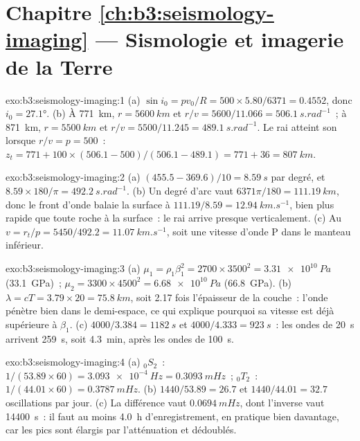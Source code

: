 \section*{Chapitre \ref{ch:b3:seismology-imaging} --- Sismologie et imagerie de la Terre}

\begin{solution}{exo:b3:seismology-imaging:1}
(a) $\sin i_0 = pv_0/R = 500\times5.80/6371 = 0.4552$, donc $i_0 = \ang{27.1}$.
(b) À \qty{771}{km}, $r = \qty{5600}{km}$ et $r/v = 5600/11.066 =
\qty{506.1}{s.rad^{-1}}$~; à \qty{871}{km}, $r = \qty{5500}{km}$ et $r/v =
5500/11.245 = \qty{489.1}{s.rad^{-1}}$. Le rai atteint son  lorsque $r/v = p = 500$~:
$z_t = 771 + 100\times(506.1 - 500)/(506.1 - 489.1) = 771 + 36 =
\qty{807}{km}$.
\end{solution}

\begin{solution}{exo:b3:seismology-imaging:2}
(a) $(455.5 - 369.6)/10 = \qty{8.59}{s}$ par degré, et
$8.59\times180/\pi = \qty{492.2}{s.rad^{-1}}$. (b) Un degré d'arc vaut
$6371\pi/180 = \qty{111.19}{km}$, donc le front d'onde balaie la surface à
$111.19/8.59 = \qty{12.94}{km.s^{-1}}$, bien plus rapide que toute roche à la
surface~: le rai arrive presque verticalement. (c) Au  $v = r_t/p =
5450/492.2 = \qty{11.07}{km.s^{-1}}$, soit une vitesse d'onde P dans le manteau inférieur.
\end{solution}

\begin{solution}{exo:b3:seismology-imaging:3}
(a) $\mu_1 = \rho_1\beta_1^2 = 2700\times3500^2 = \qty{3.31e10}{Pa}$
(\qty{33.1}{GPa})~; $\mu_2 = 3300\times4500^2 = \qty{6.68e10}{Pa}$
(\qty{66.8}{GPa}). (b) $\lambda = cT = 3.79\times20 = \qty{75.8}{km}$, soit 2.17
fois l'épaisseur de la couche~: l'onde pénètre bien dans le demi-espace, ce qui
explique pourquoi sa vitesse est déjà supérieure à $\beta_1$. (c) $4000/3.384 = \qty{1182}{s}$ et
$4000/4.333 = \qty{923}{s}$~: les ondes de 20~s arrivent \qty{259}{s}, soit
\qty{4.3}{min}, après les ondes de 100~s.
\end{solution}

\begin{solution}{exo:b3:seismology-imaging:4}
(a) ${}_0S_2$~: $1/(53.89\times60) = \qty{3.093e-4}{Hz} = \qty{0.3093}{mHz}$~;
${}_0T_2$~: $1/(44.01\times60) = \qty{0.3787}{mHz}$. (b) $1440/53.89 = 26.7$
et $1440/44.01 = 32.7$ oscillations par jour. (c) La différence vaut
$\qty{0.0694}{mHz}$, dont l'inverse vaut \qty{14400}{s}~: il faut au moins
\qty{4.0}{h} d'enregistrement, en pratique bien davantage, car les pics sont élargis
par l'atténuation et dédoublés.
\end{solution}

